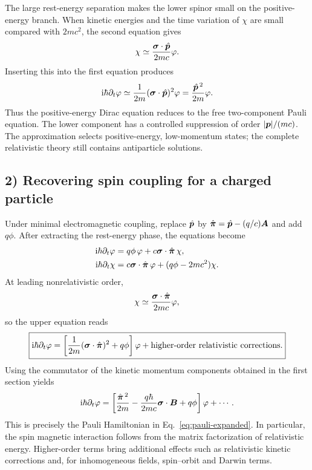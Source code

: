 The large rest-energy separation makes the lower spinor small on the positive-energy branch. When kinetic energies and the time variation of $\chi$ are small compared with $2mc^2$, the second equation gives
\begin{equation}
 \chi\simeq\frac{\bm{\sigma}\cdot\hat{\bm{p}}}{2mc}\varphi.
\end{equation}
Inserting this into the first equation produces
\begin{equation}
 \mathrm{i}\hbar\partial_t\varphi
 \simeq\frac1{2m}(\bm{\sigma}\cdot\hat{\bm{p}})^2\varphi
 =\frac{\hat{\bm{p}}^{\,2}}{2m}\varphi.
\end{equation}
Thus the positive-energy Dirac equation reduces to the free two-component Pauli equation. The lower component has a controlled suppression of order $|\bm{p}|/(mc)$. The approximation selects positive-energy, low-momentum states; the complete relativistic theory still contains antiparticle solutions.

\subsection*{2) Recovering spin coupling for a charged particle}
Under minimal electromagnetic coupling, replace $\hat{\bm{p}}$ by
$\hat{\bm{\pi}}=\hat{\bm{p}}-(q/c)\bm{A}$ and add $q\phi$. After extracting the rest-energy phase, the equations become
\begin{equation}
\begin{aligned}
\mathrm{i}\hbar\partial_t\varphi&=q\phi\,\varphi
       +c\bm{\sigma}\cdot\hat{\bm{\pi}}\,\chi,\\
\mathrm{i}\hbar\partial_t\chi&=c\bm{\sigma}\cdot\hat{\bm{\pi}}\,\varphi
      +(q\phi-2mc^2)\chi.
\end{aligned}
\end{equation}
At leading nonrelativistic order,
\begin{equation}
 \chi\simeq\frac{\bm{\sigma}\cdot\hat{\bm{\pi}}}{2mc}\varphi,
\end{equation}
so the upper equation reads
\begin{equation}\label{eq:pauli-from-dirac}
\boxed{\mathrm{i}\hbar\partial_t\varphi=
\left[\frac1{2m}(\bm{\sigma}\cdot\hat{\bm{\pi}})^2+q\phi\right]\varphi
+\text{higher-order relativistic corrections}.}
\end{equation}
Using the commutator of the kinetic momentum components obtained in the first section yields
\begin{equation}
\mathrm{i}\hbar\partial_t\varphi=\left[
\frac{\hat{\bm{\pi}}^{\,2}}{2m}
-\frac{q\hbar}{2mc}\bm{\sigma}\cdot\bm{B}+q\phi\right]\varphi
+\cdots.
\end{equation}
This is precisely the Pauli Hamiltonian in Eq.~\eqref{eq:pauli-expanded}. In particular, the spin magnetic interaction follows from the matrix factorization of relativistic energy. Higher-order terms bring additional effects such as relativistic kinetic corrections and, for inhomogeneous fields, spin--orbit and Darwin terms.

